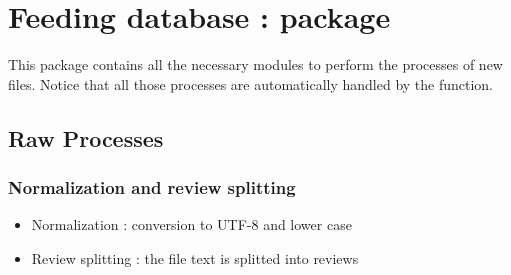 \documentclass[letterpaper,10pt,english]{sphinxmanual}
\begin{document}
\chapter{Feeding database :  package}
\label{\detokenize{index:feeding-database-process-package}}
This package contains all the necessary modules to perform the processes of new files. Notice that all those processes are automatically handled by the  function.


\section{Raw Processes}
\label{\detokenize{index:raw-processes}}

\subsection{Normalization and review splitting}
\label{\detokenize{index:normalization-and-review-splitting}}\begin{itemize}
\item {} 
Normalization : conversion to UTF-8 and lower case

\item {} 
Review splitting : the file text is splitted into reviews

\end{itemize}
\label{\detokenize{index:module-loacore.process.review_process}}
\end{document}
